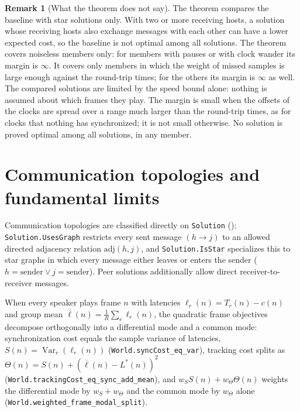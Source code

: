 \documentclass[11pt,a4paper]{article}
\newcommand{\lean}[1]{\texttt{#1}}
\theoremstyle{definition}
\newtheorem{remark}[definition]{Remark}
\begin{document}
\begin{remark}[What the theorem does not say]
The theorem compares the baseline with star solutions only. With two or more
receiving hosts, a solution whose receiving hosts also exchange messages
with each other can have a lower expected cost, so the baseline is not
optimal among all solutions. The theorem covers noiseless members only:
for members with pauses or with clock wander its margin is $\infty$. It
covers only members in which the weight of missed samples is large enough
against the round-trip times; for the others its margin is $\infty$ as
well. The compared solutions are limited by the speed bound alone: nothing
is assumed about which frames they play. The margin
is small when the offsets of the clocks are spread over a range much larger
than the round-trip times, as for clocks that nothing has synchronized; it
is not small otherwise. No solution is proved optimal among all solutions,
in any member.
\end{remark}

\section{Communication topologies and fundamental limits}\label{sec:limits}

Communication topologies are classified directly on \lean{Solution}
(): \lean{Solution.UsesGraph}
restricts every sent message $(h \to j)$ to an allowed directed adjacency
relation $\mathrm{adj}(h, j)$, and \lean{Solution.IsStar} specializes this
to star graphs in which every message either leaves or enters the sender
($h = \mathrm{sender} \lor j = \mathrm{sender}$). Peer solutions
additionally allow direct receiver-to-receiver messages.

When every speaker plays frame $n$ with latencies
$\ell_r(n) = T_r(n) - c(n)$ and group mean
$\overline{\ell}(n) = \frac{1}{R}\sum_r \ell_r(n)$, the quadratic frame
objectives decompose orthogonally into a differential mode and a common
mode: synchronization cost equals the sample variance of latencies,
$S(n) = \operatorname{Var}_r(\ell_r(n))$
(\lean{World.\allowbreak syncCost\_\allowbreak eq\_\allowbreak var}),
tracking cost splits as
$\Theta(n) = S(n) + (\overline{\ell}(n) - L^*(n))^2$
(\lean{World.\allowbreak trackingCost\_\allowbreak eq\_\allowbreak sync\_\allowbreak add\_\allowbreak mean}),
and $w_S S(n) + w_\Theta \Theta(n)$ weights the differential mode by
$w_S + w_\Theta$ and the common mode by $w_\Theta$ alone
(\lean{World.\allowbreak weighted\_\allowbreak frame\_\allowbreak modal\_\allowbreak split}).
\end{document}
